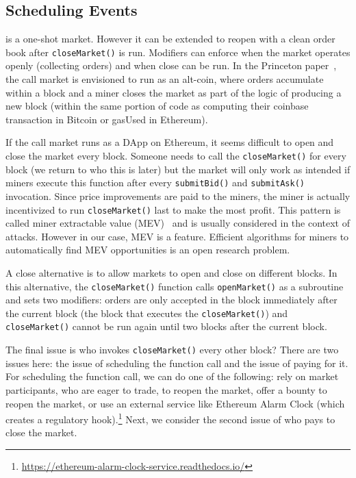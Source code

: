 
\subsection{Scheduling Events}

\cm is a one-shot market. However it can be extended to reopen with a clean order book after \texttt{closeMarket()} is run. Modifiers can enforce when the market operates openly (collecting orders) and when close can be run. In the Princeton paper~\cite{clark2014decentralizing}, the call market is envisioned to run as an alt-coin, where orders accumulate within a block and a miner closes the market as part of the logic of producing a new block (\ie within the same portion of code as computing their coinbase transaction in Bitcoin or gasUsed in Ethereum). 

If the call market runs as a DApp on Ethereum, it seems difficult to open and close the market every block. Someone needs to call the \texttt{closeMarket()} for every block (we return to who this is later) but the market will only work as intended if miners execute this function after every \texttt{submitBid()} and \texttt{submitAsk()} invocation. Since price improvements are paid to the miners, the miner is actually incentivized to run \texttt{closeMarket()} last to make the most profit. This pattern is called miner extractable value (MEV)~\cite{daian2019flash} and is usually considered in the context of attacks. However in our case, MEV is a feature. Efficient algorithms for miners to automatically find MEV opportunities is an open research problem.


A close alternative is to allow markets to open and close on different blocks. In this alternative, the \texttt{closeMarket()} function calls \texttt{openMarket()} as a subroutine and sets two modifiers: orders are only accepted in the block immediately after the current block (\ie the block that executes the \texttt{closeMarket()}) and \texttt{closeMarket()} cannot be run again until two blocks after the current block. 

The final issue is who invokes \texttt{closeMarket()} every other block? There are two issues here: the issue of scheduling the function call and the issue of paying for it. For scheduling the function call, we can do one of the following: rely on market participants, who are eager to trade, to reopen the market, offer a bounty to reopen the market, or use an external service like Ethereum Alarm Clock (which creates a regulatory hook).\footnote{\url{https://ethereum-alarm-clock-service.readthedocs.io/}} Next, we consider the second issue of who pays to close the market. 

